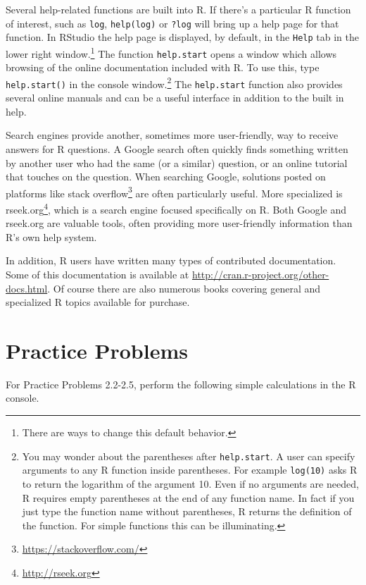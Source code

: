 \documentclass[
]{krantz}
\renewcommand{\href}[2]{#2\footnote{\url{#1}}}
\begin{document}
Several help-related functions are built into R. If there's a particular R function of interest, such as \texttt{log}, \texttt{help(log)} or \texttt{?log} will bring up a help page for that function. In RStudio the help page is displayed, by default, in the \texttt{Help} tab in the lower right window.\footnote{There are ways to change this default behavior.} The function \texttt{help.start} opens a window which allows browsing of the online documentation included with R. To use this, type \texttt{help.start()} in the console window.\footnote{You may wonder about the parentheses after \texttt{help.start}. A user can specify arguments to any R function inside parentheses. For example \texttt{log(10)} asks R to return the logarithm of the argument 10. Even if no arguments are needed, R requires empty parentheses at the end of any function name. In fact if you just type the function name without parentheses, R returns the definition of the function. For simple functions this can be illuminating.} The \texttt{help.start} function also provides several online manuals and can be a useful interface in addition to the built in help.

Search engines provide another, sometimes more user-friendly, way to receive answers for R questions. A Google search often quickly finds something written by another user who had the same (or a similar) question, or an online tutorial that touches on the question. When searching Google, solutions posted on platforms like \href{https://stackoverflow.com/}{stack overflow} are often particularly useful. More specialized is \href{http://rseek.org}{rseek.org}, which is a search engine focused specifically on R. Both Google and rseek.org are valuable tools, often providing more user-friendly information than R's own help system.

In addition, R users have written many types of contributed documentation. Some of this documentation is available at \url{http://cran.r-project.org/other-docs.html}. Of course there are also numerous books covering general and specialized R topics available for purchase.

\hypertarget{practiceProblemsSectionIntroR}{%
\section{Practice Problems}\label{practiceProblemsSectionIntroR}}

For Practice Problems 2.2-2.5, perform the following simple calculations in the R console.
\end{document}
